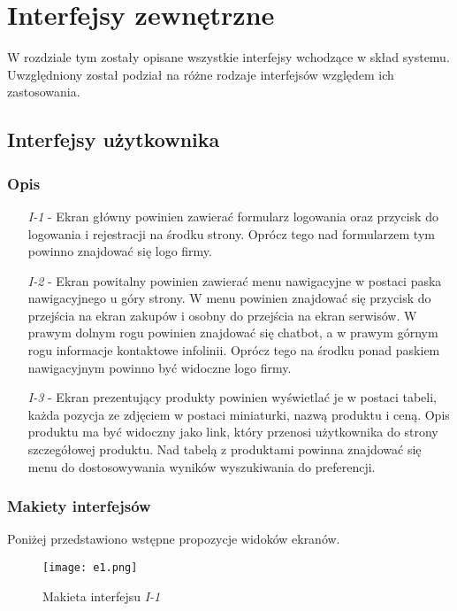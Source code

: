 \documentclass[a4paper,20pt]{article}
\begin{document}
\newpage
\section{Interfejsy zewnętrzne}
W rozdziale tym zostały opisane wszystkie interfejsy wchodzące w skład systemu. Uwzględniony został podział na różne rodzaje interfejsów względem ich zastosowania. 

\subsection{Interfejsy użytkownika}

\subsubsection{Opis}

\begin{itemize}
\item [\textit{I-1}] - Ekran główny powinien zawierać formularz logowania oraz przycisk do logowania i rejestracji na środku strony. Oprócz tego nad formularzem tym powinno znajdować się logo firmy. \\
\item [\textit{I-2}] - Ekran powitalny powinien zawierać menu nawigacyjne w postaci paska nawigacyjnego u góry strony. W menu powinien znajdować się przycisk do przejścia na ekran zakupów i osobny do przejścia na ekran serwisów. W prawym dolnym rogu powinien znajdować się chatbot, a w prawym górnym rogu informacje kontaktowe infolinii. Oprócz tego na środku ponad paskiem nawigacyjnym powinno być widoczne logo firmy. \\
\item [\textit{I-3}] - Ekran prezentujący produkty powinien wyświetlać je w postaci tabeli, każda pozycja ze zdjęciem w postaci miniaturki, nazwą produktu i ceną. Opis produktu ma być widoczny jako link, który przenosi użytkownika do strony szczegółowej produktu. Nad tabelą z produktami powinna znajdować się menu do dostosowywania wyników wyszukiwania do preferencji.
\end{itemize}

\subsubsection{Makiety interfejsów}
Poniżej przedstawiono wstępne propozycje widoków ekranów. 

\begin{figure}[H]
\centerline{\texttt{[image: e1.png]}}
\caption{Makieta interfejsu \textit{I-1}}
\label{e1}
\end{figure}
\end{document}
